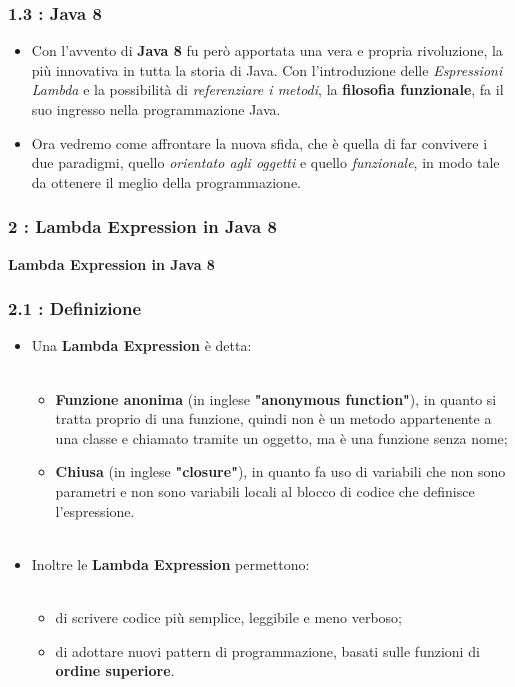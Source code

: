 \documentclass{beamer}
\begin{document}

\begin{frame}
	\frametitle{\textbf{1.3 : Java 8}}
	\begin{itemize}
		\item
			Con l'avvento di \textbf{Java 8} fu però apportata una vera e propria rivoluzione, la più innovativa in tutta la storia di Java. Con l'introduzione delle \textit{Espressioni Lambda} e la possibilità di \textit{referenziare i metodi}, la \textbf{filosofia funzionale}, fa il suo ingresso nella programmazione Java.
		\item
			Ora vedremo come affrontare la nuova sfida, che è quella di far convivere i due paradigmi, quello \textit{orientato agli oggetti} e quello \textit{funzionale}, in modo tale da ottenere il meglio della programmazione.				
	\end{itemize}
\end{frame}


\begin{frame}
	\frametitle{\textbf{2 : Lambda Expression in Java 8}}
	\begin{center}
		\textbf{\Huge Lambda Expression in Java 8}
	\end{center}
\end{frame}


\begin{frame}
	\frametitle{\textbf{2.1 : Definizione}}
	\begin{itemize}
			\item
				Una \textbf{Lambda Expression} è detta:\\\
				\begin{itemize}
					\item
						\textbf{Funzione anonima} (in inglese \textbf{"anonymous function"}), in quanto si tratta proprio di una funzione, quindi non è un metodo appartenente a una classe e chiamato tramite un oggetto, ma è una funzione senza nome;
					\item \textbf{Chiusa} (in inglese \textbf{"closure"}), in quanto fa uso di variabili che non sono parametri e non sono variabili locali al blocco di codice che definisce l'espressione.\\\
				\end{itemize}
			\item
				Inoltre le \textbf{Lambda Expression} permettono:\\\
				\begin{itemize}
					\item
						di scrivere codice più semplice, leggibile e meno verboso;
					\item
						di adottare nuovi pattern di programmazione, basati sulle funzioni di \textbf{ordine superiore}.
				\end{itemize}				
	\end{itemize}
\end{frame}
\end{document}
